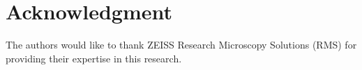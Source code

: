 \section{Acknowledgment}\label{sec9:Acknowledgment}
The authors would like to thank ZEISS Research Microscopy Solutions (RMS) for providing their expertise in this research.